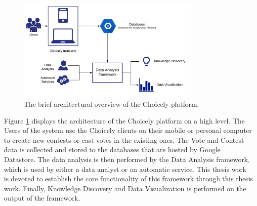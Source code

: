     \begin{figure}[h] 
		\begin{center}
            \includegraphics[width=0.8\textwidth]{Images/architecture.png}
			\caption{The brief architectural overview of the Choicely platform.}
			\label{choicely_architecture}
		\end{center}
    \end{figure}

    Figure \ref{choicely_architecture} displays the architecture of the Choicely platform on a high level. The Users of the system use the Choicely clients on their mobile or personal computer to create new contests or cast votes in the existing ones. 
    The Vote and Contest data is collected and stored to the databases that are hosted by Google Datastore. The data analysis is then performed by the Data Analysis framework, which is used by either a data analyst or an automatic service. This thesis work is devoted to establish the core functionality of this framework through this thesis work. Finally, Knowledge Discovery and Data Visualization is performed on the output of the framework. 

    

